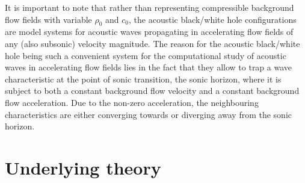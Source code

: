 It is important to note that rather than representing compressible background flow fields with variable $\rho_0$ and $c_0$, the acoustic black/white hole configurations are model systems for acoustic waves propagating in accelerating flow fields of any (also subsonic) velocity magnitude. The reason for the acoustic black/white hole being such a convenient system for the computational study of acoustic waves in accelerating flow fields lies in the fact that they allow to trap a wave characteristic at the point of sonic transition, the sonic horizon, where it is subject to both a constant background flow velocity and a constant background flow acceleration. Due to the non-zero acceleration, the neighbouring characteristics are either converging towards or diverging away from the sonic horizon.

\section{Underlying theory}
\label{sec:Underlying theory}

